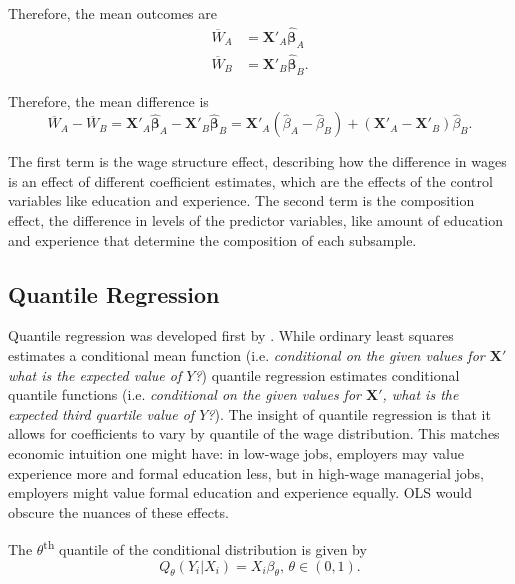 \documentclass[12pt]{article}
\begin{document}
Therefore, the mean outcomes are
\begin{align*}
	\overline{W}_A &= \mathbf{X'}_{A} \mathbf{\hat{\beta}}_{A} \\
	\overline{W}_B &= \mathbf{X'}_{B} \mathbf{\hat{\beta}}_{B}
.\end{align*}

Therefore, the mean difference is
\begin{equation}
	\overline{W}_A - \overline{W}_B = \mathbf{X'}_{A} \mathbf{\hat{\beta}}_{A} - \mathbf{X'}_{B} \mathbf{\hat{\beta}}_{B} = \mathbf{X'}_{A}\left(\hat{\beta}_A - \hat{\beta}_B  \right) + \left(\mathbf{X'}_A - \mathbf{X'}_B  \right)  \hat{\beta}_B
.\end{equation}

The first term is the wage structure effect, describing how the difference in wages is an effect of different coefficient estimates, which are the effects of the control variables like education and experience. The second term is the composition effect, the difference in levels of the predictor variables, like amount of education and experience that determine the composition of each subsample.

\subsection{Quantile Regression
\label{subsec:quantile-regression}}
Quantile regression was developed first by \citet{KoenkerandBassett1978}. While ordinary least squares estimates a conditional mean function (i.e.\textit{ conditional on the given values for $\mathbf{X'}$ what is the expected value of $Y$?}) quantile regression estimates conditional quantile functions (i.e.\textit{ conditional on the given values for $\mathbf{X'}$, what is the expected third quartile value of $Y$?}). The insight of quantile regression is that it allows for coefficients to vary by quantile of the wage distribution. This matches economic intuition one might have: in low-wage jobs, employers may value experience more and formal education less, but in high-wage managerial jobs, employers might value formal education and experience equally. OLS would obscure the nuances of these effects.

The $\theta$\textsuperscript{th} quantile of the conditional distribution is given by
\begin{equation}
	Q_{\theta}\left(Y_i|X_i \right) = X_{i}\beta_{\theta}, \, \theta \in (0, 1)
.\end{equation}
\end{document}
